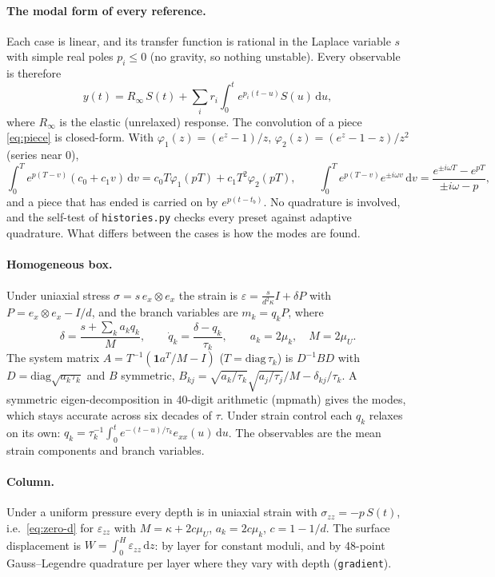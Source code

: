 \documentclass[11pt]{article}
\numberwithin{equation}{section}
\newcommand{\eps}{\varepsilon}
\newcommand{\code}[1]{\texttt{#1}}
\begin{document}
\paragraph{The modal form of every reference.}
Each case is linear, and its transfer function is rational in the
Laplace variable $s$ with simple real poles $p_i\le0$ (no gravity, so
nothing unstable). Every observable is therefore
\begin{equation}
  y(t) = R_\infty\,S(t) + \sum_i r_i\int_0^t e^{p_i(t-u)}S(u)\,\mathrm{d}u ,
  \label{eq:modal}
\end{equation}
where $R_\infty$ is the elastic (unrelaxed) response. The convolution of a
piece \eqref{eq:piece} is closed-form. With $\varphi_1(z)=(e^z-1)/z$,
$\varphi_2(z)=(e^z-1-z)/z^2$ (series near $0$),
\begin{equation}
  \int_0^{T}e^{p(T-v)}(c_0+c_1v)\,\mathrm{d}v = c_0T\varphi_1(pT)+c_1T^2\varphi_2(pT),
  \qquad
  \int_0^{T}e^{p(T-v)}e^{\pm i\omega v}\,\mathrm{d}v = \frac{e^{\pm i\omega T}-e^{pT}}{\pm i\omega-p},
\end{equation}
and a piece that has ended is carried on by $e^{p(t-t_b)}$. No
quadrature is involved, and the self-test of \code{histories.py} checks
every preset against adaptive quadrature. What differs between the cases
is how the modes are found.

\paragraph{Homogeneous box.}
Under uniaxial stress $\sigma=s\,e_x\otimes e_x$ the strain is
$\eps=\frac{s}{d^2\kappa}I+\delta P$ with $P=e_x\otimes e_x-I/d$, and the
branch variables are $m_k=q_kP$, where
\begin{equation}
  \delta=\frac{s+\sum_ka_kq_k}{M},\qquad \dot q_k=\frac{\delta-q_k}{\tau_k},
  \qquad a_k=2\mu_k,\quad M=2\mu_U .
  \label{eq:zero-d}
\end{equation}
The system matrix $A=T^{-1}(\mathbf 1a^{T}/M-I)$ ($T=\mathrm{diag}\,\tau_k$)
is $D^{-1}BD$ with $D=\mathrm{diag}\sqrt{a_k\tau_k}$ and $B$ symmetric,
$B_{kj}=\sqrt{a_k/\tau_k}\sqrt{a_j/\tau_j}/M-\delta_{kj}/\tau_k$. A
symmetric eigen-decomposition in 40-digit arithmetic (mpmath) gives the
modes, which stays accurate across six decades of $\tau$. Under strain
control each $q_k$ relaxes on its own:
$q_k=\tau_k^{-1}\int_0^te^{-(t-u)/\tau_k}e_{xx}(u)\,\mathrm{d}u$. The
observables are the mean strain components and branch variables.

\paragraph{Column.}
Under a uniform pressure every depth is in uniaxial strain with
$\sigma_{zz}=-p\,S(t)$, i.e.\ \eqref{eq:zero-d} for $\eps_{zz}$ with
$M=\kappa+2c\mu_U$, $a_k=2c\mu_k$, $c=1-1/d$. The surface displacement is
$W=\int_0^H\eps_{zz}\,\mathrm{d}z$: by layer for constant moduli, and by
48-point Gauss--Legendre quadrature per layer where they vary with depth
(\code{gradient}).
\end{document}
